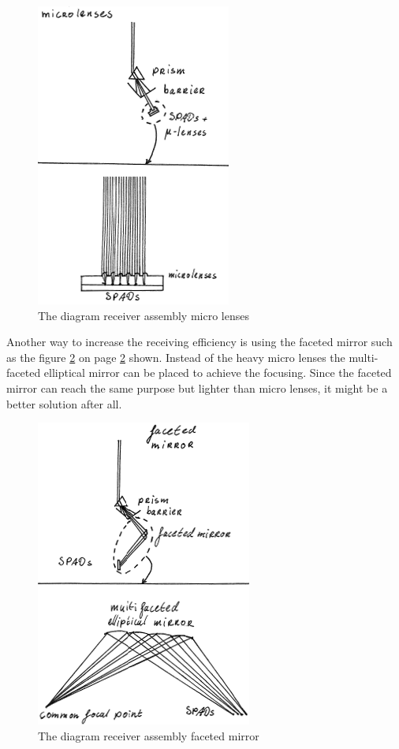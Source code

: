 \begin{figure}
\centering
\includegraphics[scale = 0.6]{chapters/img/DiagramReceiverAssemblyMicrolenses.png}
\caption{The diagram receiver assembly micro lenses}
\label{fig:diagram_Rmicrolenses}
\end{figure}
Another way to increase the receiving efficiency is using the faceted mirror such as the figure \ref{fig:diagram_Rfaceted mirror} on page \ref{fig:diagram_Rfaceted mirror} shown. Instead of the heavy micro lenses the multi-faceted elliptical mirror can be placed to achieve the focusing. Since the faceted mirror can reach the same purpose but lighter than micro lenses, it might be a better solution after all. 

\begin{figure}
\centering
\includegraphics[scale = 0.6]{chapters/img/DiagramReceiverAssemblyFacetedMirror.png}
\caption{The diagram receiver assembly faceted mirror}
\label{fig:diagram_Rfaceted mirror}
\end{figure}


